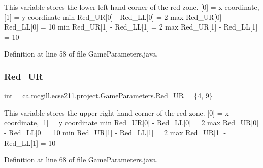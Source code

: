 This variable stores the lower left hand corner of the red zone. \mbox{[}0\mbox{]} = x coordinate, \mbox{[}1\mbox{]} = y coordinate min Red\+\_\+\+UR\mbox{[}0\mbox{]} -\/ Red\+\_\+\+LL\mbox{[}0\mbox{]} = 2 max Red\+\_\+\+UR\mbox{[}0\mbox{]} -\/ Red\+\_\+\+LL\mbox{[}0\mbox{]} = 10 min Red\+\_\+\+UR\mbox{[}1\mbox{]} -\/ Red\+\_\+\+LL\mbox{[}1\mbox{]} = 2 max Red\+\_\+\+UR\mbox{[}1\mbox{]} -\/ Red\+\_\+\+LL\mbox{[}1\mbox{]} = 10 

Definition at line 58 of file Game\+Parameters.\+java.

\mbox{\label{classca_1_1mcgill_1_1ecse211_1_1project_1_1_game_parameters_a81ddd789119962c32fe6d7f9cce4f240}} 
\subsubsection{\texorpdfstring{Red\+\_\+\+UR}{Red\_UR}}
{\footnotesize\ttfamily int \mbox{[}$\,$\mbox{]} ca.\+mcgill.\+ecse211.\+project.\+Game\+Parameters.\+Red\+\_\+\+UR = \{4, 9\}\hspace{0.3cm}{\ttfamily [static]}}

This variable stores the upper right hand corner of the red zone. \mbox{[}0\mbox{]} = x coordinate, \mbox{[}1\mbox{]} = y coordinate min Red\+\_\+\+UR\mbox{[}0\mbox{]} -\/ Red\+\_\+\+LL\mbox{[}0\mbox{]} = 2 max Red\+\_\+\+UR\mbox{[}0\mbox{]} -\/ Red\+\_\+\+LL\mbox{[}0\mbox{]} = 10 min Red\+\_\+\+UR\mbox{[}1\mbox{]} -\/ Red\+\_\+\+LL\mbox{[}1\mbox{]} = 2 max Red\+\_\+\+UR\mbox{[}1\mbox{]} -\/ Red\+\_\+\+LL\mbox{[}1\mbox{]} = 10 

Definition at line 68 of file Game\+Parameters.\+java.

\mbox{\label{classca_1_1mcgill_1_1ecse211_1_1project_1_1_game_parameters_acf0dce5eb9dc754248f0c3de997d2809}} 
